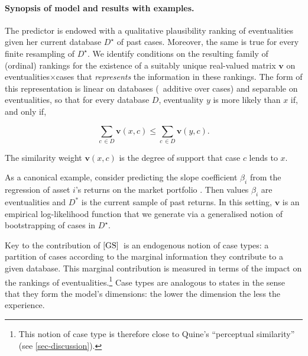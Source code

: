 \documentclass[12pt,a4paper,twoside]{article}
\newcommand{\gsii}{$\textup{[GS]}$}
\begin{document}
\paragraph{Synopsis of model and results with examples.} The predictor is endowed with a
qualitative plausibility ranking of eventualities given her current database
$D^{\star}$ of past cases. Moreover, the same is true for every finite
resampling of $D^{\star}$. We identify conditions on the resulting family of
(ordinal) rankings for the existence of a suitably unique
real-valued matrix $\mathbf v$ on eventualities$\times$cases that \emph{represents} the
information in these rankings. The form of this representation is linear on
databases (\ie\ additive over cases) and separable on eventualities, so that for
every database $D$, eventuality $y$ is
more likely than $x$ if, and only if,
\begin{linenomath*}
  \begin{equation}\label{eq-similarity}
  \sum_{c\,\in D} \mathbf  v(x,c) \leq \sum_{c\,\in D} \mathbf v(y,c).
\end{equation}
\end{linenomath*}
The similarity weight $\mathbf{v}(x,c)$ is the degree of support that case $c$
lends to $x$.
\begin{example}As a canonical example, consider predicting the slope coefficient
  $\beta_{i}$ from the regression of asset $i$'s returns on the market portfolio
  \citep[in the two-pass method of][]{FM-Two_pass}. Then values $\beta_{i}$ are
  eventualities and $D^{*}$ is the current sample of past returns. In this
  setting, $\mathbf v$ is an empirical log-likelihood function that we generate
  via a generalised notion of bootstrapping of cases in $D^{\star}$.
\end{example}
Key to the contribution of \gsii\ is an endogenous notion of case types: a
partition of cases according to the marginal information they contribute to a
given database. This marginal contribution is measured in terms of the impact on
the rankings of eventualities.\footnote{This notion of case type is therefore
  close to Quine's ``perceptual similarity'' (see \cref{sec-discussion}).}  Case
types are analogous to states in the sense that they form the model's
dimensions: the lower the dimension the less the experience.
\end{document}
